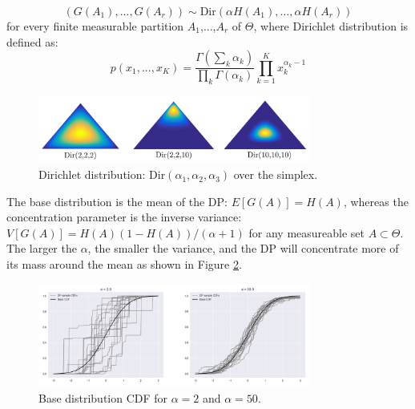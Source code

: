 \begin{equation}
    (G(A_1),...,G(A_r)) \sim \mathrm{Dir}(\alpha H(A_1),...,\alpha H(A_r))
\end{equation}
for every finite measurable partition $A_1$,...,$A_r$ of $\Theta$, where Dirichlet distribution is defined as:
\begin{equation}
    p(x_1,...,x_K) = \frac{\Gamma(\sum_k \alpha_k)}{\prod_k \Gamma(\alpha_k)}\prod_{k=1}^{K}x_{k}^{\alpha_k-1}
\end{equation}

\begin{figure}[tbhp]
    \centering
    \includegraphics[width=0.8\textwidth, trim={10 10 10 10}]{figures/dir_merged.png}
    \caption{Dirichlet distribution: $\mathrm{Dir}(\alpha_1,\alpha_2,\alpha_3)$ over the simplex.}
    \label{fig:dir_merged}
\end{figure}

The base distribution is the mean of the DP: $E[G(A)] = H(A)$, whereas the concentration parameter is the inverse variance: $V[G(A)] = H(A)(1-H(A))/(\alpha+1)$ for any measureable set $A\subset \Theta$. The larger the $\alpha$, the smaller the variance, and the DP will concentrate more of its mass around the mean as shown in Figure \ref{fig:dp_cdf}.

\begin{figure}[tbhp]
    \centering
    \includegraphics[width=0.8\textwidth, trim={10 10 10 10}]{figures/dp_cdf.png}
    \caption{Base distribution CDF for $\alpha=2$ and $\alpha=50$.}
    \label{fig:dp_cdf}
\end{figure}

